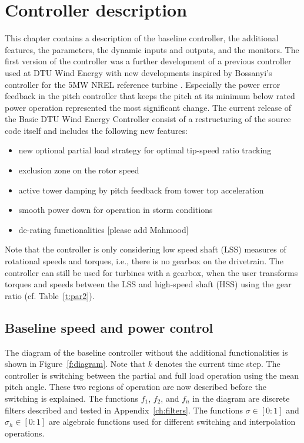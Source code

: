 \chapter{Controller description} 
\label{cha:description}

This chapter contains a description of the baseline controller, the additional features, the parameters, the dynamic inputs and outputs, and the monitors. The first version of the controller \cite{Hansen13} was a further development of a previous controller used at DTU Wind Energy with new developments inspired by Bossanyi's controller for the 5MW NREL reference turbine \cite{Bossanyi09}. Especially the power error feedback in the pitch controller that keeps the pitch at its minimum below rated power operation represented the most significant change. The current release of the Basic DTU Wind Energy Controller consist of a restructuring of the source code itself and includes the following new features: 
\begin{itemize}
  \item{new optional partial load strategy for optimal tip-speed ratio tracking}
	\item{exclusion zone on the rotor speed} 
	\item{active tower damping by pitch feedback from tower top acceleration} 
	\item{smooth power down for operation in storm conditions} 
	\item{de-rating functionalities [please add Mahmood]}
\end{itemize}
Note that the controller is only considering low speed shaft (LSS) measures of rotational speeds and torques, i.e., there is no gearbox on the drivetrain. The controller can still be used for turbines with a gearbox, when the user transforms torques and speeds between the LSS and high-speed shaft (HSS) using the gear ratio (cf. Table~\ref{t:par2}).

\section{Baseline speed and power control}

The diagram of the baseline controller without the additional functionalities is shown in Figure~\ref{f:diagram}. Note that $k$ denotes the current time step. The controller is switching between the partial and full load operation using the mean pitch angle. These two regions of operation are now described before the switching is explained. The functions $f_1$, $f_2$, and $f_n$ in the diagram are discrete filters described and tested in Appendix~\ref{ch:filters}. The functions $\sigma\in[0:1]$ and $\sigma_h\in[0:1]$ are algebraic functions used for different switching and interpolation operations.

